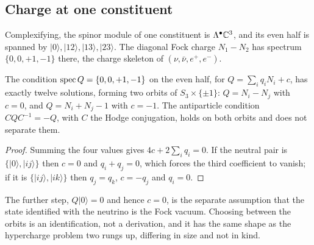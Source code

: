 \subsection{Charge at one constituent}

Complexifying, the spinor module of one constituent is $\Lambda^\bullet\mathbb{C}^3$, and its even half is spanned by
$|0\rangle,|12\rangle,|13\rangle,|23\rangle$. The diagonal Fock charge $N_1-N_2$ has spectrum $\{0,0,+1,-1\}$ there, the charge skeleton of
$(\nu,\bar\nu,e^+,e^-)$.

\begin{theorem}
\label{thm:fock}
The condition $\operatorname{spec} Q=\{0,0,+1,-1\}$ on the even half, for $Q=\sum_iq_iN_i+c$, has exactly twelve solutions, forming two orbits of
$S_3\times\{\pm1\}$: $Q=N_i-N_j$ with $c=0$, and $Q=N_i+N_j-1$ with $c=-1$. The antiparticle condition $CQC^{-1}=-Q$, with $C$ the Hodge
conjugation, holds on both orbits and does not separate them.
\end{theorem}

\begin{proof}
Summing the four values gives $4c+2\sum_iq_i=0$. If the neutral pair is $\{|0\rangle,|ij\rangle\}$ then $c=0$ and $q_i+q_j=0$, which forces
the third coefficient to vanish; if it is $\{|ij\rangle,|ik\rangle\}$ then $q_j=q_k$, $c=-q_j$ and $q_i=0$.
\end{proof}

The further step, $Q|0\rangle=0$ and hence $c=0$, is the separate assumption that the state identified with the neutrino is the Fock vacuum.
Choosing between the orbits is an identification, not a derivation, and it has the same shape as the hypercharge problem two rungs up,
differing in size and not in kind.

